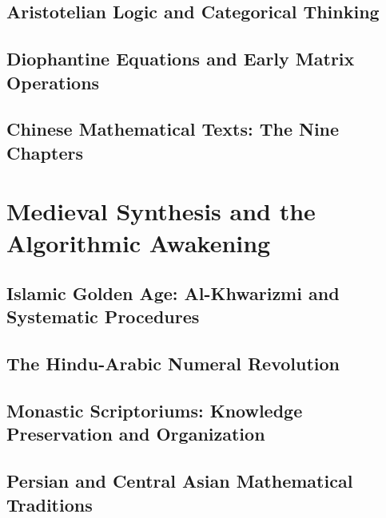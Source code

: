 \documentclass[12pt, oneside, openany]{book}
\begin{document}
\section{Aristotelian Logic and Categorical Thinking}

\section{Diophantine Equations and Early Matrix Operations}

\section{Chinese Mathematical Texts: The Nine Chapters}


\chapter{Medieval Synthesis and the Algorithmic Awakening}

\section{Islamic Golden Age: Al-Khwarizmi and Systematic Procedures}

\section{The Hindu-Arabic Numeral Revolution}

\section{Monastic Scriptoriums: Knowledge Preservation and Organization}

\section{Persian and Central Asian Mathematical Traditions}
\end{document}
